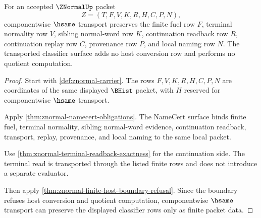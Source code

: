 \begin{theorem}
\label{thm:znormal-finite-fuel-classifier-stability}
For an accepted $\ZNormalUp$ packet
$$
Z=(T,F,V,K,R,H,C,P,N),
$$
componentwise $\hsame$ transport preserves the finite fuel row $F$, terminal
normality row $V$, sibling normal-word row $K$, continuation readback row $R$,
continuation replay row $C$, provenance row $P$, and local naming row $N$.
The transported classifier surface adds no host conversion row and performs no
quotient computation.
\end{theorem}
\begin{proof}
Start with \autoref{def:znormal-carrier}. The rows $F,V,K,R,H,C,P,N$ are
coordinates of the same displayed $\BHist$ packet, with $H$ reserved for
componentwise $\hsame$ transport.

Apply \autoref{thm:znormal-namecert-obligations}. The NameCert surface binds
finite fuel, terminal normality, sibling normal-word evidence, continuation
readback, transport, replay, provenance, and local naming to the same local
packet.

Use \autoref{thm:znormal-terminal-readback-exactness} for the continuation
side. The terminal read is transported through the listed finite rows and does
not introduce a separate evaluator.

Then apply \autoref{thm:znormal-finite-host-boundary-refusal}. Since the
boundary refuses host conversion and quotient computation, componentwise
$\hsame$ transport can preserve the displayed classifier rows only as finite
packet data.
\end{proof}

